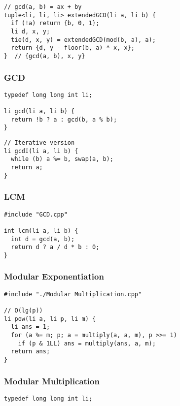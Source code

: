 \documentclass[twoside]{article}
\begin{document}
\begin{multicols*}{2}
\begin{verbatim}
// gcd(a, b) = ax + by
tuple<li, li, li> extendedGCD(li a, li b) {
  if (!a) return {b, 0, 1};
  li d, x, y;
  tie(d, x, y) = extendedGCD(mod(b, a), a);
  return {d, y - floor(b, a) * x, x};
}  // {gcd(a, b), x, y}
\end{verbatim}

\subsubsectionfont{\large\bfseries\sffamily\underline}
\subsubsection*{GCD}
\begin{verbatim}
typedef long long int li;

li gcd(li a, li b) {
  return !b ? a : gcd(b, a % b);
}
\end{verbatim}
\vspace{-12pt}
\begin{verbatim}
// Iterative version
li gcdI(li a, li b) {
  while (b) a %= b, swap(a, b);
  return a;
}
\end{verbatim}

\subsubsectionfont{\large\bfseries\sffamily\underline}
\subsubsection*{LCM}
\begin{verbatim}
#include "GCD.cpp"

int lcm(li a, li b) {
  int d = gcd(a, b);
  return d ? a / d * b : 0;
}
\end{verbatim}

\subsubsectionfont{\large\bfseries\sffamily\underline}
\subsubsection*{Modular Exponentiation}
\begin{verbatim}
#include "./Modular Multiplication.cpp"

// O(lg(p))
li pow(li a, li p, li m) {
  li ans = 1;
  for (a %= m; p; a = multiply(a, a, m), p >>= 1)
    if (p & 1LL) ans = multiply(ans, a, m);
  return ans;
}
\end{verbatim}

\subsubsectionfont{\large\bfseries\sffamily\underline}
\subsubsection*{Modular Multiplication}
\begin{verbatim}
typedef long long int li;


\end{verbatim}
\end{multicols*}
\end{document}
